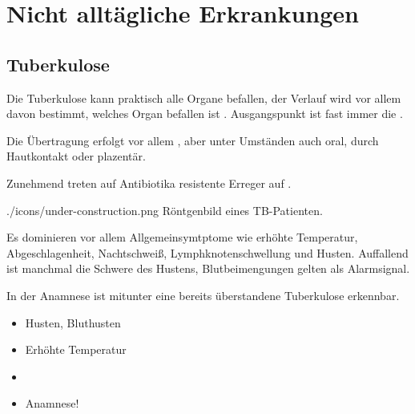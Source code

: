 \clearpage %
\section{Nicht alltägliche Erkrankungen}



\subsection{Tuberkulose}
\label{topic:tuberkulose}


{
Die Tuberkulose kann praktisch alle Organe befallen, der
Verlauf wird vor allem davon bestimmt, welches
Organ befallen ist . Ausgangspunkt ist fast immer die .

Die Übertragung erfolgt vor allem , aber unter
Umständen auch oral, durch Hautkontakt oder plazentär. 

Zunehmend treten auf Antibiotika resistente Erreger auf .


    
}{}
{./icons/under-construction.png}
{Röntgenbild eines TB-Pat\-ient\-en.}{}


{%
Es dominieren vor allem Allgemeinsymtptome wie erhöhte
Temperatur, Abgeschlagenheit, Nachtschweiß,
Lymphknotenschwellung und Husten. Auffallend ist manchmal
die Schwere des Hustens, Blutbeimengungen gelten als
Alarmsignal.

In der Anamnese ist mitunter eine bereits überstandene
Tuberkulose erkennbar.
}{
\begin{itemize}
  \item Husten, Bluthusten
  \item Erhöhte Temperatur
  \item {}
  \item Anamnese!
\end{itemize}
}
{}
{}
{}


